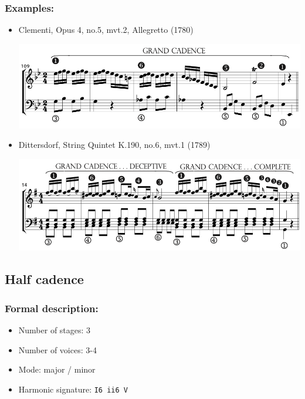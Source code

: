 \documentclass[11pt, openany]{article}
\begin{document}
\subsubsection{Examples:}
\begin{itemize}
\item Clementi, Opus 4, no.5, mvt.2, Allegretto (1780)
\begin{center}
\includegraphics[scale=0.5]{clementi4.png}
\end{center}
\item Dittersdorf, String Quintet K.190, no.6, mvt.1 (1789)
\begin{center}
\includegraphics[scale=0.5]{dittersdorf190.png}
\end{center}
\end{itemize}

	
	\subsection{Half cadence}

\subsubsection{Formal description:}
\begin{itemize}
\item Number of stages: 3
\item Number of voices: 3-4
\item Mode: major / minor
\item Harmonic signature: \texttt{I6 ii6 V}
\end{itemize}
\end{document}
